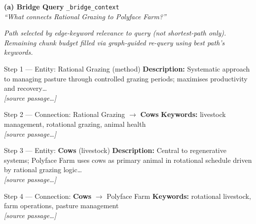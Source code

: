 \documentclass{article}
\newcommand{\passagemark}{\textit{\color{gray}\scriptsize [source passage\ldots]}}
\newcommand{\paneltitle}[3]{%
  \begin{tcolorbox}[
    colback=querybg, colframe=querybg,
    boxrule=0pt, arc=4pt, top=4pt, bottom=4pt, left=6pt, right=6pt]
    {\small\bfseries\sffamily\color{white} #1}
    \hfill{\tiny\sffamily\color{white!70}\texttt{#2}}\\[1pt]
    {\scriptsize\sffamily\color{white!85}\textit{``#3''}}
  \end{tcolorbox}%
}
\begin{document}
\begin{minipage}[t]{0.487\textwidth}

\paneltitle{(a) Bridge Query}{\_bridge\_context}{What connects Rational Grazing to Polyface Farm?}

\vspace{4pt}

{\scriptsize\sffamily\color{gray!60}
\textit{Path selected by edge-keyword relevance to query (not shortest-path only).
Remaining chunk budget filled via graph-guided re-query using best path's keywords.}}

\vspace{4pt}

\begin{entitybox}{Step 1 — Entity: Rational Grazing \normalfont\color{gray}(method)}
\scriptsize\sffamily
\textbf{Description:} Systematic approach to managing pasture through controlled
grazing periods; maximises productivity and recovery\ldots\\
\passagemark
\end{entitybox}

\vspace{3pt}

\begin{connbox}{Step 2 — Connection: Rational Grazing $\boldsymbol{\rightarrow}$ \textbf{Cows}}
\scriptsize\sffamily
\textbf{Keywords:} livestock management, rotational grazing, animal health\\
\passagemark
\end{connbox}

\vspace{3pt}

\begin{entitybox}{Step 3 — Entity: \textbf{Cows} \normalfont\color{gray}(livestock)}
\scriptsize\sffamily
\textbf{Description:} Central to regenerative systems; Polyface Farm uses cows
as primary animal in rotational schedule driven by rational grazing logic\ldots\\
\passagemark
\end{entitybox}

\vspace{3pt}

\begin{connbox}{Step 4 — Connection: \textbf{Cows} $\boldsymbol{\rightarrow}$ Polyface Farm}
\scriptsize\sffamily
\textbf{Keywords:} rotational livestock, farm operations, pasture management\\
\passagemark
\end{connbox}


\end{minipage}
\end{document}
